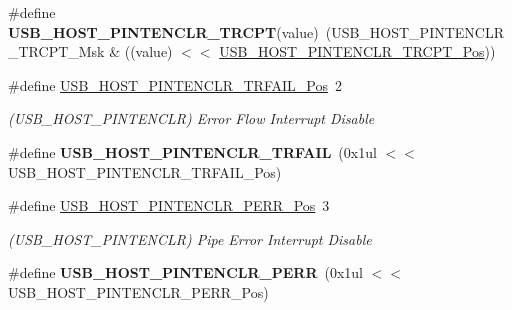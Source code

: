 \begin{DoxyCompactItemize}
\item 
\hypertarget{group___s_a_m_l21___u_s_b_gaaff2fe89b42b77aa06c1cccff3705aae}{}\#define {\bfseries U\+S\+B\+\_\+\+H\+O\+S\+T\+\_\+\+P\+I\+N\+T\+E\+N\+C\+L\+R\+\_\+\+T\+R\+C\+P\+T}(value)~(U\+S\+B\+\_\+\+H\+O\+S\+T\+\_\+\+P\+I\+N\+T\+E\+N\+C\+L\+R\+\_\+\+T\+R\+C\+P\+T\+\_\+\+Msk \& ((value) $<$$<$ \hyperlink{group___s_a_m_l21___u_s_b_gaac8d2314c05e22f66ed87241531e7b5f}{U\+S\+B\+\_\+\+H\+O\+S\+T\+\_\+\+P\+I\+N\+T\+E\+N\+C\+L\+R\+\_\+\+T\+R\+C\+P\+T\+\_\+\+Pos}))\label{group___s_a_m_l21___u_s_b_gaaff2fe89b42b77aa06c1cccff3705aae}

\item 
\hypertarget{group___s_a_m_l21___u_s_b_gae82db3b32cc40753296c82030081ca1e}{}\#define \hyperlink{group___s_a_m_l21___u_s_b_gae82db3b32cc40753296c82030081ca1e}{U\+S\+B\+\_\+\+H\+O\+S\+T\+\_\+\+P\+I\+N\+T\+E\+N\+C\+L\+R\+\_\+\+T\+R\+F\+A\+I\+L\+\_\+\+Pos}~2\label{group___s_a_m_l21___u_s_b_gae82db3b32cc40753296c82030081ca1e}

\begin{DoxyCompactList}\small\item\em (U\+S\+B\+\_\+\+H\+O\+S\+T\+\_\+\+P\+I\+N\+T\+E\+N\+C\+L\+R) Error Flow Interrupt Disable \end{DoxyCompactList}\item 
\hypertarget{group___s_a_m_l21___u_s_b_ga00dad3369611abbe54310c5a2c565be7}{}\#define {\bfseries U\+S\+B\+\_\+\+H\+O\+S\+T\+\_\+\+P\+I\+N\+T\+E\+N\+C\+L\+R\+\_\+\+T\+R\+F\+A\+I\+L}~(0x1ul $<$$<$ U\+S\+B\+\_\+\+H\+O\+S\+T\+\_\+\+P\+I\+N\+T\+E\+N\+C\+L\+R\+\_\+\+T\+R\+F\+A\+I\+L\+\_\+\+Pos)\label{group___s_a_m_l21___u_s_b_ga00dad3369611abbe54310c5a2c565be7}

\item 
\hypertarget{group___s_a_m_l21___u_s_b_ga475bbae21c182b1aadf319a1612618a0}{}\#define \hyperlink{group___s_a_m_l21___u_s_b_ga475bbae21c182b1aadf319a1612618a0}{U\+S\+B\+\_\+\+H\+O\+S\+T\+\_\+\+P\+I\+N\+T\+E\+N\+C\+L\+R\+\_\+\+P\+E\+R\+R\+\_\+\+Pos}~3\label{group___s_a_m_l21___u_s_b_ga475bbae21c182b1aadf319a1612618a0}

\begin{DoxyCompactList}\small\item\em (U\+S\+B\+\_\+\+H\+O\+S\+T\+\_\+\+P\+I\+N\+T\+E\+N\+C\+L\+R) Pipe Error Interrupt Disable \end{DoxyCompactList}\item 
\hypertarget{group___s_a_m_l21___u_s_b_gaf2e21eaa8018ebb7a95fe6947483f522}{}\#define {\bfseries U\+S\+B\+\_\+\+H\+O\+S\+T\+\_\+\+P\+I\+N\+T\+E\+N\+C\+L\+R\+\_\+\+P\+E\+R\+R}~(0x1ul $<$$<$ U\+S\+B\+\_\+\+H\+O\+S\+T\+\_\+\+P\+I\+N\+T\+E\+N\+C\+L\+R\+\_\+\+P\+E\+R\+R\+\_\+\+Pos)\label{group___s_a_m_l21___u_s_b_gaf2e21eaa8018ebb7a95fe6947483f522}


\end{DoxyCompactItemize}
